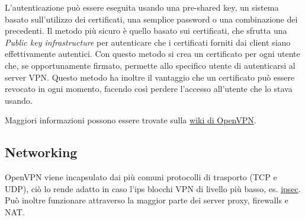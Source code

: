 L'autenticazione può essere eseguita usando una pre-shared key, un sistema basato sull'utilizzo dei certificati, una semplice password o una combinazione dei precedenti. Il metodo più sicuro è quello basato sui certificati, che sfrutta una \textit{Public key infrastructure} \cite{pki} per autenticare che i certificati forniti dai client siano effettivamente autentici. Con questo metodo si crea un certificato per ogni utente che, se opportunamente firmato, permette allo specifico utente di autenticarsi al server VPN. Questo metodo ha inoltre il vantaggio che un certificato può essere revocato in ogni momento, facendo così perdere l'accesso all'utente che lo stava usando. 

Maggiori informazioni possono essere trovate sulla \href{https://community.openvpn.net/openvpn/wiki/How_does_PKI_work}{wiki di OpenVPN}.

\subsection{Networking }
\label{subsec:openvpn-networking}

OpenVPN viene incapsulato dai più comuni protocolli di trasporto (TCP e UDP), ciò lo rende adatto in caso l'ips blocchi VPN di livello più basso, es. \href{https://en.wikipedia.org/wiki/IPsec}{ipsec}. Può inoltre funzionare attraverso la maggior parte dei server proxy, firewalls e NAT.


